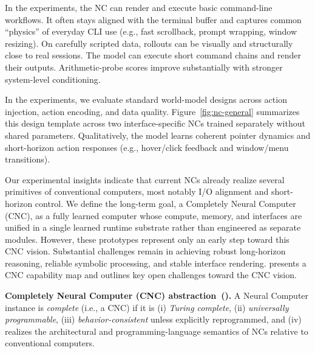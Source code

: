 In the \nccligen{} experiments, the NC can render and execute basic command-line workflows.
It often stays aligned with the terminal buffer and captures common ``physics'' of everyday CLI use (e.g., fast scrollback, prompt wrapping, window resizing).
On carefully scripted data, rollouts can be visually and structurally close to real sessions.
The model can execute short command chains and render their outputs.
Arithmetic-probe scores improve substantially with stronger system-level conditioning.

In the \ncguiworld{} experiments, we evaluate standard world-model designs across action injection, action encoding, and data quality.
Figure~\ref{fig:nc-general} summarizes this design template across two interface-specific NCs trained separately without shared parameters.
Qualitatively, the model learns coherent pointer dynamics and short-horizon action responses (e.g., hover/click feedback and window/menu transitions).

Our experimental insights indicate that current NCs already realize several primitives of conventional computers, most notably I/O alignment and short-horizon control.
We define the long-term goal, a Completely Neural Computer (CNC), as a fully learned computer whose compute, memory, and interfaces are unified in a single learned runtime substrate rather than engineered as separate modules.
However, these prototypes represent only an early step toward this CNC vision.
Substantial challenges remain in achieving robust long-horizon reasoning, reliable symbolic processing, and stable interface rendering.
 presents a CNC capability map and outlines key open challenges toward the CNC vision. 

\begin{tcolorbox}[
  colback=metablue!8,
  colframe=metablue!40,
  boxrule=0pt,
  borderline west={1pt}{0pt}{gray!60},
  left=6pt,right=4pt,top=3pt,bottom=3pt]
\small
\textbf{Completely Neural Computer (CNC) abstraction~().}
A Neural Computer instance is \emph{complete} (i.e., a CNC) if it is
(i) \emph{Turing complete},
(ii) \emph{universally programmable},
(iii) \emph{behavior-consistent} unless explicitly reprogrammed, and
(iv) realizes the architectural and programming-language semantics of NCs relative to conventional computers.
\end{tcolorbox}

